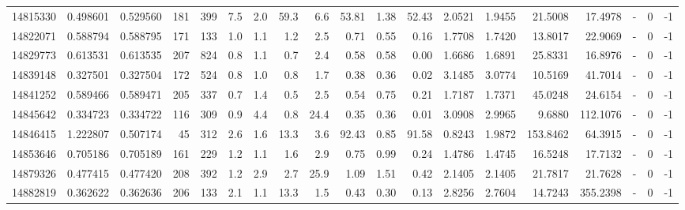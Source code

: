 \begin{tabular}{rrrrrrrrrrrrrrrrlrr}
  14815330 & 0.498601 &   0.529560 &  181 &  399 &      7.5 &      2.0 &    59.3 &      6.6 &      53.81 &        1.38 &       52.43 &  2.0521 &  1.9455 &   21.5008 &   17.4978 &             - &        0 &         -1 \\
  14822071 & 0.588794 &   0.588795 &  171 &  133 &      1.0 &      1.1 &     1.2 &      2.5 &       0.71 &        0.55 &        0.16 &  1.7708 &  1.7420 &   13.8017 &   22.9069 &             - &        0 &         -1 \\
  14829773 & 0.613531 &   0.613535 &  207 &  824 &      0.8 &      1.1 &     0.7 &      2.4 &       0.58 &        0.58 &        0.00 &  1.6686 &  1.6891 &   25.8331 &   16.8976 &             - &        0 &         -1 \\
  14839148 & 0.327501 &   0.327504 &  172 &  524 &      0.8 &      1.0 &     0.8 &      1.7 &       0.38 &        0.36 &        0.02 &  3.1485 &  3.0774 &   10.5169 &   41.7014 &             - &        0 &         -1 \\
  14841252 & 0.589466 &   0.589471 &  205 &  337 &      0.7 &      1.4 &     0.5 &      2.5 &       0.54 &        0.75 &        0.21 &  1.7187 &  1.7371 &   45.0248 &   24.6154 &             - &        0 &         -1 \\
  14845642 & 0.334723 &   0.334722 &  116 &  309 &      0.9 &      4.4 &     0.8 &     24.4 &       0.35 &        0.36 &        0.01 &  3.0908 &  2.9965 &    9.6880 &  112.1076 &             - &        0 &         -1 \\
  14846415 & 1.222807 &   0.507174 &   45 &  312 &      2.6 &      1.6 &    13.3 &      3.6 &      92.43 &        0.85 &       91.58 &  0.8243 &  1.9872 &  153.8462 &   64.3915 &             - &        0 &         -1 \\
  14853646 & 0.705186 &   0.705189 &  161 &  229 &      1.2 &      1.1 &     1.6 &      2.9 &       0.75 &        0.99 &        0.24 &  1.4786 &  1.4745 &   16.5248 &   17.7132 &             - &        0 &         -1 \\
  14879326 & 0.477415 &   0.477420 &  208 &  392 &      1.2 &      2.9 &     2.7 &     25.9 &       1.09 &        1.51 &        0.42 &  2.1405 &  2.1405 &   21.7817 &   21.7628 &             - &        0 &         -1 \\
  14882819 & 0.362622 &   0.362636 &  206 &  133 &      2.1 &      1.1 &    13.3 &      1.5 &       0.43 &        0.30 &        0.13 &  2.8256 &  2.7604 &   14.7243 &  355.2398 &             - &        0 &         -1 \\

\end{tabular}

